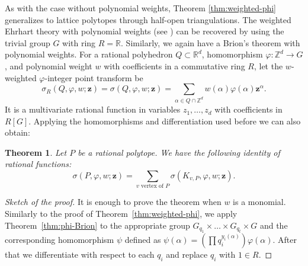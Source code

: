 \documentclass[12pt,reqno]{amsart}
\newtheorem{thm}{Theorem}[section]
\theoremstyle{definition}
\theoremstyle{remark}
\newcommand{\R}{\mathbb{R}}
\newcommand{\Z}{\mathbb{Z}}
\renewcommand{\phi}{\varphi}
\begin{document}
As with the case without polynomial weights, Theorem \ref{thm:weighted-phi} generalizes to lattice polytopes through half-open triangulations. The weighted Ehrhart theory with polynomial weights (see \cite{Weighted_Bajo_etal}) can be recovered by using the trivial group $G$ with ring $R=\R$. Similarly, we again have a Brion's theorem with polynomial weights. For a rational polyhedron $Q \subset \R^d$, homomorphism $\varphi : \Z^d \rightarrow G$, and polynomial weight $w$ with coefficients in a commutative ring $R$, let the $w$-weighted $\varphi$-integer point transform be
\[
\sigma_R(Q,\varphi,w;\mathbf{z}) = \sigma(Q,\varphi,w;\mathbf{z}) =  
\sum_{\alpha \in Q \cap \Z^d} w(\alpha)\varphi(\alpha)\mathbf{z}^\alpha.
\]
It is a multivariate rational function in variables $z_1,\dots, z_d$ with coefficients in $R[G]$.
Applying the homomorphisms and differentiation used before we can also obtain:

\begin{thm}\label{thm:weighte-phi-Brion}
Let $P$ be a rational polytope.  We have the following identity of rational functions:
\[
\sigma(P,\varphi,w;\mathbf{z}) =  \sum_{v \text{ vertex of }P} \sigma(K_{v,P}, \varphi,w; \mathbf{z}).
\]
\end{thm}


\begin{proof}[Sketch of the proof]
It is enough to prove the theorem when $w$ is a monomial. Similarly to the proof of Theorem~\ref{thm:weighted-phi}, we apply Theorem~\ref{thm:phi-Brion} to the appropriate group $G_{q_1}\times \ldots \times G_{q_t}\times G$ and the corresponding homomorphism $\psi$ defined as $\psi(\alpha)=\left( \prod q_i^{y_i(\alpha)}\right)\phi(\alpha)$. After that we differentiate with respect to each $q_i$ and replace $q_i$ with $1\in R$.
\end{proof}
\end{document}

